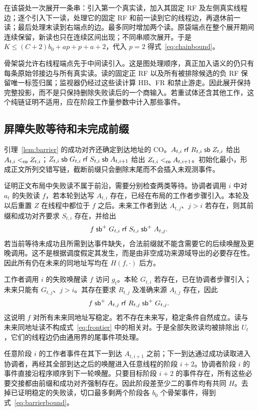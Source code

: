 在该袋处一次展开一条串：引入第一个真实读，加入其固定 RF 及左侧真实线程边；逐个引入下一读，处理它的固定 RF 和前一读到它的线程边，再退休前一读；最后处理末读到右端点的边。最多同时增加两个读。原袋端点在整个展开期间连续保留，新读也只在连续区间出现；不同串顺次展开。于是 $K\le(C+2)b_0+ap+p+a+2$，代入 $p=2$ 得式~\eqref{eq:chainbound}。

骨架袋允许右线程端点先于中间读引入。这是图处理顺序，真正加入语义的仍只有每条原始邻接边与所有真实读。读的固定正 RF 以及所有被排除候选的负 RF 保留唯一标签归属；监视器仍经过这些读计算 HB、FR 和禁止游走。因此展开保持完整投影，而不是只保持删除失败读后的一个商输入。若重试体还含其他工作，这个纯链证明不适用，应在阶段工作量参数中计入那些事件。

\subsection{屏障失败等待和未完成前缀}\label{app:barriertails}
引理~\ref{lem:barrier} 的成功对齐还确定到达地址的 CO。$A_{t,i}\mathrel{\mathsf{rf}} R_{t,i}\mathrel{\mathsf{sb}} Z_{t,i}$ 给出 $A_{t,i}<_{\mathsf{co}}Z_{t,i}$；$Z_{t,i}\mathrel{\mathsf{sb}} G_{t,i}\mathrel{\mathsf{rf}} S_{t,i}\mathrel{\mathsf{sb}} A_{t,i+1}$ 给出 $Z_{t,i}<_{\mathsf{co}}A_{t,i+1}$。初始化最小，形成正文所列交错写链，截断前缀只会删除末尾而不会插入未观测事件。

证明正文布局中失败读不属于前沿，需要分别检查两类等待。协调者调用 $i$ 中对 $a_t$ 的失败读 $f$，若本轮到达写 $A_{t,i}$ 存在，已经在布局的工作者步骤引入。本轮及以后重置 $Z$ 在线程中都位于 $f$ 之后。未来工作者到达 $A_{t,j}$、$j>i$ 若存在，则其前缀和成功对齐要求 $S_{t,i}$ 存在，并给出
\[
 f\mathrel{\mathsf{sb}^+}G_{t,i}\mathrel{\mathsf{rf}} S_{t,i}\mathrel{\mathsf{sb}^+}A_{t,j}.
\]
若当前等待未成功且所需到达事件缺失，合法前缀就不能含需要它的后续唤醒及更晚调用。这不是根据调度假定其发生，而是由非空成功来源域导出的必要存在性。因此所有仍在未来的同地址写均在 $H(f,\cdot)$ 后方。

工作者调用 $i$ 的失败唤醒读 $f$ 访问 $g_t$。本轮 $G_{t,i}$ 若存在，已在协调者步骤引入；未来只能有 $G_{t,j}$、$j>i$。其存在要求 $R_{t,j}$ 及准确来源 $A_{t,j}$ 存在，因此
\[
 f\mathrel{\mathsf{sb}^+}A_{t,j}\mathrel{\mathsf{rf}} R_{t,j}\mathrel{\mathsf{sb}^+}G_{t,j}.
\]
这说明 $f$ 对所有未来同地址写稳定。若不存在未来写，稳定条件自然成立。读与未来同地址读不构成式~\eqref{eq:frontier} 中的相关对。于是全部失败读均被排除出 $U_t$，它们的线程边仍由通用界的尾事件项处理。

任意阶段 $i$ 的工作者事件在其下一到达 $A_{t,i+1}$ 之前；下一到达通过成功读取进入协调者，再经其全部到达之后的唤醒进入任意线程的阶段 $i+2$。协调者阶段 $i$ 的事件直接沿程序顺序到下一轮唤醒。只要目标阶段 $i+2$ 的事件存在，所有这些必要交接都由前缀和成功对齐强制存在。因此阶段差至少二的事件均有共同 $H$。去掉已证明稳定的失败读，切口最多剩两个阶段各 $b_0$ 个骨架事件，得到式~\eqref{eq:barrierbound}。

